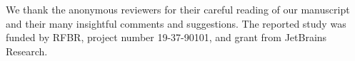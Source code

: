 \documentclass[sigconf,table]{acmart}
\begin{document}
	\maketitle










\begin{acks}
We thank the anonymous reviewers for their careful reading of our manuscript and their many insightful comments and suggestions. The reported study was funded by RFBR, project number 19-37-90101, and grant from JetBrains Research.
\end{acks}

%



%

\appendix


\end{document}
